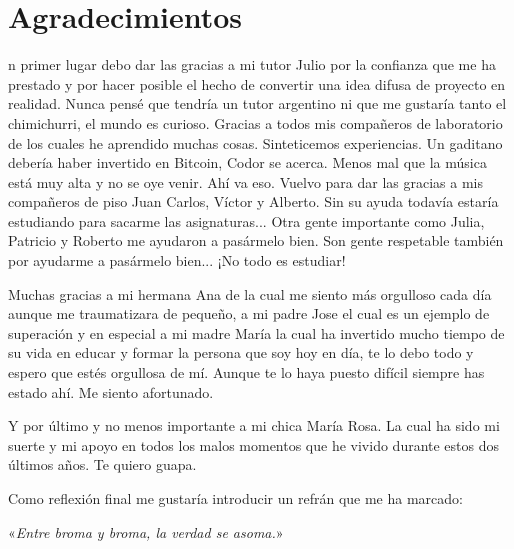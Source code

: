 \chapter{Agradecimientos}

n primer lugar debo dar las gracias a mi tutor Julio por la confianza que me ha prestado y por hacer posible el hecho de convertir una idea difusa de proyecto en realidad. Nunca pensé que tendría un tutor argentino ni que me gustaría tanto el chimichurri, el mundo es curioso. Gracias a todos mis compañeros de laboratorio de los cuales he aprendido muchas cosas. Sinteticemos experiencias. Un gaditano debería haber invertido en Bitcoin, Codor se acerca. Menos mal que la música está muy alta y no se oye venir. Ahí va eso. Vuelvo para dar las gracias a mis compañeros de piso Juan Carlos, Víctor y Alberto. Sin su ayuda todavía estaría estudiando para sacarme las asignaturas... Otra gente importante como Julia, Patricio y Roberto me ayudaron a pasármelo bien. Son gente respetable también por ayudarme a pasármelo bien... ¡No todo es estudiar!

Muchas gracias a mi hermana Ana de la cual me siento más orgulloso cada día aunque me traumatizara de pequeño, a mi padre Jose el cual es un ejemplo de superación y en especial a mi madre María la cual ha invertido mucho tiempo de su vida en educar y formar la persona que soy hoy en día, te lo debo todo y espero que estés orgullosa de mí. Aunque te lo haya puesto difícil siempre has estado ahí. Me siento afortunado.

Y por último y no menos importante a mi chica María Rosa. La cual ha sido mi suerte y mi apoyo en todos los malos momentos que he vivido durante estos dos últimos años. Te quiero guapa.

Como reflexión final me gustaría introducir un refrán que me ha marcado:

\begin{flushright}
«\textit{Entre broma y broma, la verdad se asoma.}»
\end{flushright}

